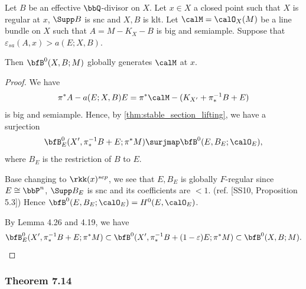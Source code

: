     \begin{theorem}\label{thm:plus_stable_section_generate_sheaf}
        Let \(B\) be an effective \(\bbQ\)-divisor on \(X\).
        Let \(x \in X\) a closed point such that \(X\) is regular at \(x\), \(\Supp B\) is snc and \(X,B\) is klt.
        Let \(\calM = \calO_X(M)\) be a line bundle on \(X\) such that \(A = M-K_X-B\) is big and semiample.
        Suppose that \(\varepsilon_{sa}(A,x) > a(E;X,B)\).
        
        Then \(\bfB^0(X,B;M)\) globally generates \(\calM\) at \(x\).
    \end{theorem}
    \begin{proof}
        We have 
        \[ \pi^*A - a(E;X,B)E = \pi^*\calM - (K_{X'}+\pi^{-1}_*B+E) \]
        is big and semiample.
        Hence, by \cref{thm:stable_section_lifting}, we have a surjection
        \[ \bfB^0_E(X',\pi^{-1}_*B+E;\pi^*M) \surjmap \bfB^0(E,B_E;\calO_E), \]
        where \(B_E\) is the restriction of \(B\) to \(E\).

        Base changing to \(\rkk(x)^{sep}\), we see that \(E,B_E\) is globally \(F\)-regular since \(E \cong \bbP^n\), \(\Supp B_E\) is snc and its coefficients are \(< 1\).
        (ref. [SS10, Proposition 5.3])
        Hence \(\bfB^0(E,B_E;\calO_E) = H^0(E,\calO_E)\).

        By Lemma 4.26 and 4.19, we have 
        \[ \bfB_E^0(X',\pi^{-1}_*B+E;\pi^*M) \subset \bfB^0(X',\pi^{-1}_*B+(1-\varepsilon)E;\pi^*M) \subset \bfB^0(X,B;M). \]
    \end{proof}

    \subsubsection{Theorem 7.14}

